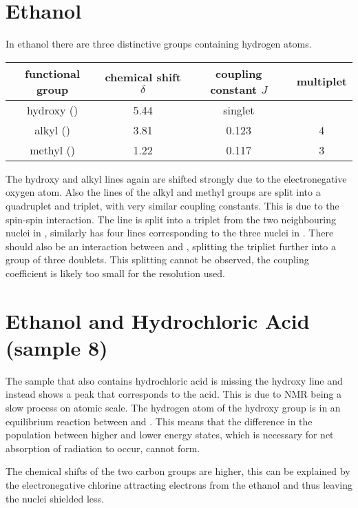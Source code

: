 \section{Ethanol}
In ethanol there are three distinctive groups containing hydrogen atoms.

\begin{center}
	\begin{tabular}{cSSc}
		\toprule
		functional group&	{chemical shift $\delta$}&	{coupling constant $J$}& multiplet\\
		\midrule
		hydroxy ()&	5.44& {singlet}\\
		alkyl ()&	3.81&	0.123&	4\\
		methyl ()&	1.22&	0.117&	3\\
		\bottomrule
	\end{tabular}
\end{center}

The hydroxy and alkyl lines again are shifted strongly due to the electronegative oxygen atom.
Also the lines of the alkyl and methyl groups are split into a quadruplet and triplet, with very similar coupling constants.
This is due to the spin-spin interaction.
The  line is split into a triplet from the two neighbouring nuclei in , similarly  has four lines corresponding to the three nuclei in .
There should also be an interaction between  and , splitting the  tripliet further into a group of three doublets.
This splitting cannot be observed, the coupling coefficient is likely too small for the resolution used.

\section{Ethanol and Hydrochloric Acid (sample 8)}

The sample that also contains hydrochloric acid is missing the hydroxy line and instead shows a peak that corresponds to the acid.
This is due to NMR being a slow process on atomic scale.
The hydrogen atom of the hydroxy group is in an equilibrium reaction between  and .
This means that the difference in the population between higher and lower energy states, which is necessary for net absorption of radiation to occur, cannot form.

The chemical shifts of the two carbon groups are higher, this can be explained by the electronegative chlorine attracting electrons from the ethanol and thus leaving the nuclei shielded less.

